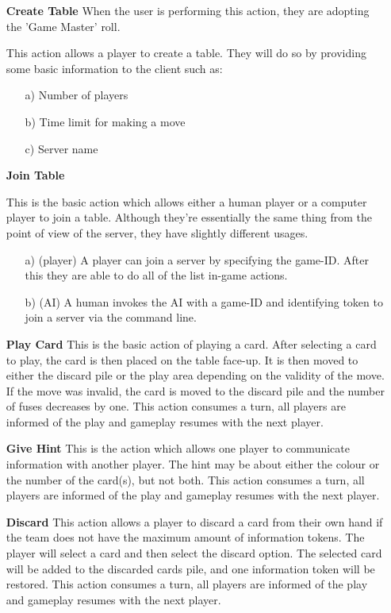 \documentclass[12pt]{article}
\begin{document}
\begin{itemize}

\item [\textbf{Create Table}]
	When the user is performing this action, they are adopting the 'Game Master'
	roll. 

	This action allows a player to create a table.  They will do so by providing
	some basic information to the client such as:
	\begin{itemize}
	\item[a)] Number of players
	\item[b)] Time limit for making a move
	\item[c)] Server name
	\end{itemize}
	

\item[\textbf{Join Table}]

This is the basic action which allows either a human player or a computer player
to join a table.  Although they're essentially the same thing from the point of view
of the server, they have slightly different usages.
	\begin{itemize}
    \item[a)](player) A player can join a server by specifying the game-ID. After this 
    they are able to do all of the list in-game actions.
    \item[b)](AI) A human invokes the AI with a game-ID and identifying 
    token to join a server via the command line.
	\end{itemize}

\item[\textbf{Play Card}]
    This is the basic action of playing a card. After selecting a card to play, 
    the card is then placed on the table face-up.  It is then moved to either
    the discard pile or the play area depending on the validity of the move.
    If the move was invalid, 
    the card is moved to the discard pile and the number of fuses decreases by
    one. This action consumes a turn, all players are informed of the play and
    gameplay resumes with the next player.

\item[\textbf{Give Hint}]
	This is the action which allows one player to communicate information with another player.
	The hint may be about 
    either the colour or the number of the card(s), but not both. 
    This action consumes a turn, all players are informed of the play and
    gameplay resumes with the next player.

\item[\textbf{Discard}]
	This action allows a player to discard a card from their own hand if the
	team does not have the maximum amount of information tokens.  The player
	will select a card and then select the discard option. The selected card
	will be added to the discarded cards pile, and one information token will be
	restored. This action consumes a turn, all players are informed of the play and
    gameplay resumes with the next player.
	

\end{itemize}
\end{document}
